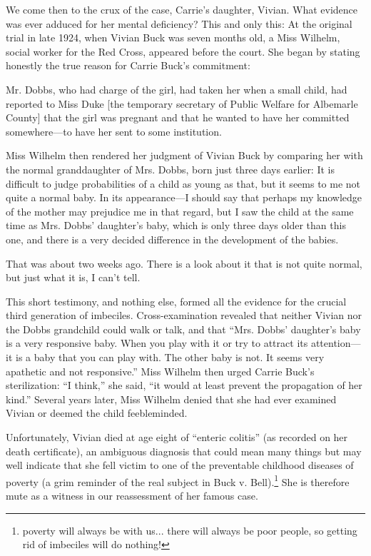 \documentclass[12pt]{letter}
\begin{document}
We come then to the crux of the case, Carrie’s daughter, Vivian. What evidence was ever
adduced for her mental deficiency? This and only this: At the original trial in late 1924,
when Vivian Buck was seven months old, a Miss Wilhelm, social worker for the Red
Cross, appeared before the court. She began by stating honestly the true reason for Carrie
Buck’s commitment:

Mr. Dobbs, who had charge of the girl, had taken her when a small child, had
reported to Miss Duke [the temporary secretary of Public Welfare for
Albemarle County] that the girl was pregnant and that he wanted to have her
committed somewhere—to have her sent to some institution.

Miss Wilhelm then rendered her judgment of Vivian Buck by comparing her with the
normal granddaughter of Mrs. Dobbs, born just three days earlier:
It is difficult to judge probabilities of a child as young as that, but it seems to
me not quite a normal baby. In its appearance—I should say that perhaps my
knowledge of the mother may prejudice me in that regard, but I saw the child
at the same time as Mrs. Dobbs’ daughter’s baby, which is only three days
older than this one, and there is a very decided difference in the development
of the babies.

That was about two weeks ago. There is a look about it that is not quite
normal, but just what it is, I can’t tell.

This short testimony, and nothing else, formed all the evidence for the crucial third
generation of imbeciles. Cross-examination revealed that neither Vivian nor the Dobbs
grandchild could walk or talk, and that “Mrs. Dobbs’ daughter’s baby is a very
responsive baby. When you play with it or try to attract its attention—it is a baby that you
can play with. The other baby is not. It seems very apathetic and not responsive.” Miss
Wilhelm then urged Carrie Buck’s sterilization: “I think,” she said, “it would at least
prevent the propagation of her kind.” Several years later, Miss Wilhelm denied that she
had ever examined Vivian or deemed the child feebleminded.

Unfortunately, Vivian died at age eight of “enteric colitis” (as recorded on her death
certificate), an ambiguous diagnosis that could mean many things but may well indicate
that she fell victim to one of the preventable childhood diseases of poverty (a grim
reminder of the real subject in Buck v. Bell).\footnote{poverty will always be with us... there will always be poor people, so getting rid of imbeciles will do nothing!} She is therefore mute as a witness in our
reassessment of her famous case.
\end{document}
